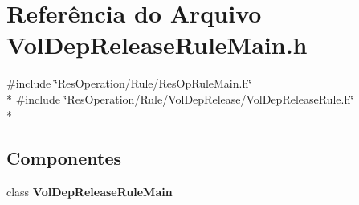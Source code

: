 \section{Referência do Arquivo Vol\+Dep\+Release\+Rule\+Main.\+h}
\label{_rule_2_vol_dep_release_2_vol_dep_release_rule_main_8h}
{\ttfamily \#include \char`\"{}Res\+Operation/\+Rule/\+Res\+Op\+Rule\+Main.\+h\char`\"{}}\\*
{\ttfamily \#include \char`\"{}Res\+Operation/\+Rule/\+Vol\+Dep\+Release/\+Vol\+Dep\+Release\+Rule.\+h\char`\"{}}\\*
\subsection*{Componentes}
\begin{DoxyCompactItemize}
\item 
class {\bf Vol\+Dep\+Release\+Rule\+Main}
\end{DoxyCompactItemize}
